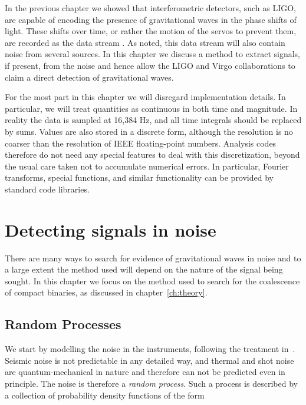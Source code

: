 In the previous chapter we showed that interferometric detectors, such
as LIGO, are capable of encoding the presence of gravitational waves
in the phase shifts of light.  These shifts over time, or rather the
motion of the servos to prevent them, are recorded as the data stream
\darmerr.  As noted, this data stream will also contain noise from
several sources.  In this chapter we discuss a method to extract
signals, if present, from the noise and hence allow the LIGO and Virgo
collaborations to claim a direct detection of gravitational waves.

For the most part in this chapter we will disregard implementation
details.  In particular, we will treat quantities as continuous in
both time and magnitude.  In reality the data is sampled at 16,384 
Hz, and all time integrals should be replaced by sums.  Values are
also stored in a discrete form, although the resolution is no coarser
than the resolution of IEEE floating-point numbers.  Analysis codes
therefore do not need any special features to deal with this
discretization, beyond the usual care taken not to accumulate
numerical errors.  In particular, Fourier transforms, special
functions, and similar functionality can be provided by standard
code libraries.



\section{Detecting signals in noise}
\label{sec:ihope_match_filter}

There are many ways to search for evidence of gravitational waves in
noise and to a large extent the method used will depend on the nature
of the signal being sought.  In this chapter we focus on the method
used to search for the coalescence of compact binaries, as discussed
in chapter~\ref{ch:theory}.

\subsection{Random Processes}
\label{ssec:random_processes}

We start by modelling the noise in the instruments, following the
treatment in~\cite{BlandfordThorne}.  Seismic noise is not predictable
in any detailed way, and thermal and shot noise are quantum-mechanical
in nature and therefore can not be predicted even in principle.  The
noise is therefore a \emph{random process}.  Such a process is
described by a collection of probability density functions of the form

